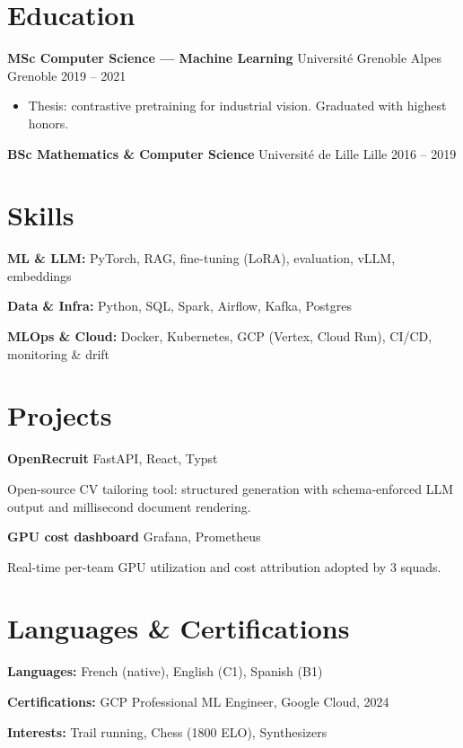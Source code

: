 \documentclass[10pt]{article}
\newcommand{\entry}[3]{\textbf{#1} \textperiodcentered{} #2 \hfill {\color{dim}\small #3}\par}
\begin{document}
\section{Education}
\entry{MSc Computer Science — Machine Learning}{Université Grenoble Alpes}{Grenoble \textperiodcentered{} 2019 -- 2021}
\begin{itemize}
  \item Thesis: contrastive pretraining for industrial vision. Graduated with highest honors.
\end{itemize}
\vspace{3pt}
\entry{BSc Mathematics \& Computer Science}{Université de Lille}{Lille \textperiodcentered{} 2016 -- 2019}

\section{Skills}
\textbf{ML \& LLM:} PyTorch, RAG, fine-tuning (LoRA), evaluation, vLLM, embeddings\par
\textbf{Data \& Infra:} Python, SQL, Spark, Airflow, Kafka, Postgres\par
\textbf{MLOps \& Cloud:} Docker, Kubernetes, GCP (Vertex, Cloud Run), CI/CD, monitoring \& drift

\section{Projects}
\textbf{OpenRecruit} \textperiodcentered{} FastAPI, React, Typst \hfill\par
Open-source CV tailoring tool: structured generation with schema-enforced LLM output and millisecond document rendering.\par\vspace{2pt}
\textbf{GPU cost dashboard} \textperiodcentered{} Grafana, Prometheus\par
Real-time per-team GPU utilization and cost attribution adopted by 3 squads.

\section{Languages \& Certifications}
\textbf{Languages:} French (native), English (C1), Spanish (B1)\par
\textbf{Certifications:} GCP Professional ML Engineer, Google Cloud, 2024\par
\textbf{Interests:} Trail running, Chess (1800 ELO), Synthesizers
\end{document}
